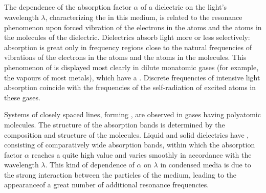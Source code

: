 \subsection{}\label{34.2.3} The dependence of the absorption factor $\alpha$ of a dielectric on the light's wavelength $\lambda$, characterizing the  in this medium, is related to the resonance phenomenon
upon forced vibration of the electrons in the atoms and the
atoms in the molecules of the dielectric. Dielectrics absorb light more or less selectively: absorption is great only in frequency regions close to the natural frequencies of vibrations of the electrons in the atoms and the atoms in the molecules. This phenomenon of  is displayed most clearly in dilute monatomic gases (for example, the vapours of most metals), which have a . Discrete frequencies of intensive light absorption coincide with
the frequencies of the self-radiation of excited atoms in these gases.

Systems of closely spaced lines, forming , are observed in gases having polyatomic molecules. The structure of the absorption bands is determined by the composition and structure of the molecules. Liquid and solid dielectrics have , consisting of comparatively wide absorption bands, within which the absorption factor $\alpha$ reaches a quite high value and varies smoothly in accordance with the wavelength $\lambda$. This kind of dependence of $\alpha$ on $\lambda$ in condensed media is due to the strong interaction between the particles of the medium, leading to the appearanceof a great number of additional resonance frequencies.

